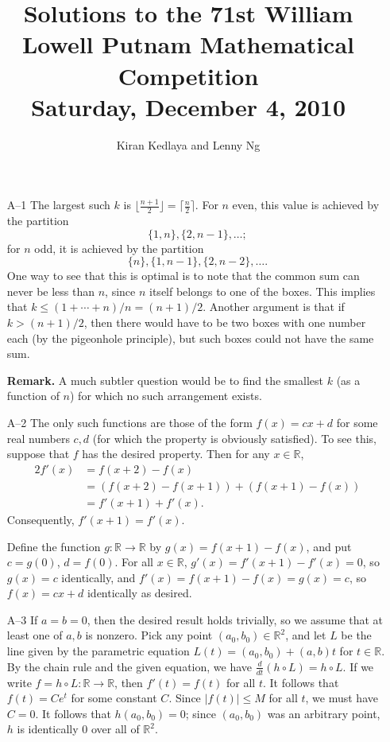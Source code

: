 \documentclass[amssymb,twocolumn,pra,10pt,aps]{revtex4-1}
\newcommand{\RR}{\mathbb{R}}
\begin{document}
\title{Solutions to the 71st William Lowell Putnam Mathematical Competition \\
    Saturday, December 4, 2010}
\author{Kiran Kedlaya and Lenny Ng}
\noaffiliation
\maketitle

\begin{itemize}

\item[A--1]
The largest such $k$ is $\lfloor \frac{n+1}{2} \rfloor = \lceil \frac{n}{2} \rceil$.
For $n$ even, this value is achieved by the partition
\[
\{1, n\}, \{2, n-1\}, \dots;
\]
for $n$ odd, it is achieved by the partition
\[
\{n\}, \{1, n-1\}, \{2, n-2\}, \dots.
\]
One way to see that this is optimal is to note that the common sum can never be less than $n$,
since $n$ itself belongs to one of the boxes. This implies that $k \leq (1 + \cdots + n)/n = (n+1)/2$.
Another argument is that if $k > (n+1)/2$, then there would have to be two boxes with one number each
(by the pigeonhole principle), but such boxes could not have the same sum.


\textbf{Remark.} A much subtler question would be to find the smallest $k$ (as a function of $n$)
for which no such arrangement exists.

\item[A--2]
The only such functions are those of the form $f(x) = cx+d$ for some real numbers $c,d$ (for which the
property is obviously satisfied). To see this, suppose that $f$ has the desired property. Then for any $x \in \RR$,
\begin{align*}
2f'(x) &= f(x+2)-f(x) \\
&= (f(x+2) - f(x+1)) + (f(x+1) - f(x)) \\
&= f'(x+1) + f'(x).
\end{align*}
Consequently, $f'(x+1) = f'(x)$.

Define the function $g: \RR \to \RR$ by $g(x) = f(x+1) - f(x)$, and put $c = g(0)$, $d = f(0)$. For all $x \in \RR$,
$g'(x) = f'(x+1) -f'(x) = 0$, so $g(x) = c$ identically,
and $f'(x) = f(x+1)-f(x) = g(x) = c$, so $f(x) = cx+d$ identically as desired.

\item[A--3]
If $a=b=0$, then the desired result holds trivially, so we assume that at least one of $a,b$ is nonzero.
Pick any point $(a_0, b_0) \in \mathbb{R}^2$, and let $L$ be the line given by the parametric equation
$L(t) = (a_0,b_0) + (a,b) t$ for $t\in \mathbb{R}$. By the chain rule and the given equation, we have $\frac{d}{dt}(h\circ L) = h\circ L$. If we write $f = h\circ L:\mathbb{R} \to \mathbb{R}$, then $f'(t) = f(t)$ for all $t$. It follows that $f(t) = Ce^t$ for some constant $C$. Since $|f(t)| \leq M$ for all $t$, we must have $C=0$.
It follows that $h(a_0,b_0) = 0$; since $(a_0,b_0)$ was an arbitrary point,
$h$ is identically $0$ over all of $\mathbb{R}^2$.


\end{itemize}
\end{document}
